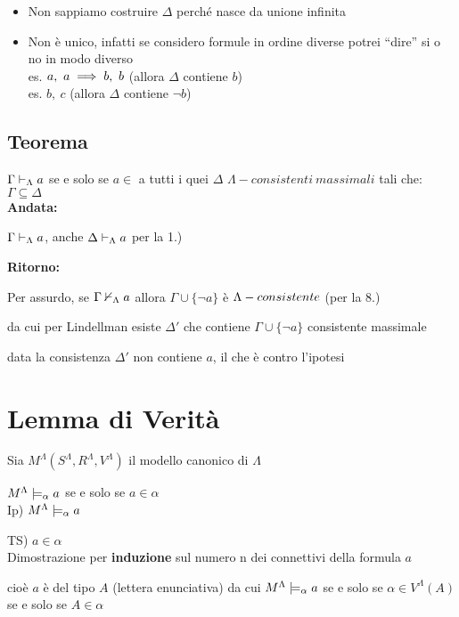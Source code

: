  
\begin{itemize}
\item Non sappiamo costruire $\Delta$ perché nasce da unione infinita 
\item Non è unico, infatti se considero formule in ordine diverse potrei
``dire'' si o no in modo diverso \\
 es. $a,\ a\implies b,\ b$ (allora $\Delta$ contiene $b$)\\
 es. $b,\ c$ (allora $\Delta$ contiene $\neg b$) 
\end{itemize}

\subsection{Teorema}

$\Gamma\vdash_{\Lambda}a$ se e solo se $a\in$ a tutti i quei $\Delta$ $\Lambda-consistenti\ massimali$
tali che: $\Gamma\subseteq\Delta$\\


\textbf{Andata:}

$\Gamma\vdash_{\Lambda}a$, anche $\Delta\vdash_{\Lambda}a$ per la 1.)

\textbf{Ritorno:}

Per assurdo, se $\Gamma\nvdash_{\Lambda}a$ allora $\Gamma\cup\{\neg a\}$
è $\mbox{\ensuremath{\Lambda}}-consistente$ (per la 8.)

da cui per Lindellman esiste $\Delta'$ che contiene $\Gamma\cup\{\neg a\}$
consistente massimale

data la consistenza $\Delta'$ non contiene $a$, il che è contro
l'ipotesi \lightning


\section{Lemma di Verità}

Sia $M^{\Lambda}(S^{\Lambda},R^{\Lambda},V^{\Lambda})$ il modello
canonico di $\Lambda$

$M^{\Lambda}\models_{\alpha}a$ se e solo se $a\in\alpha$\\


Ip) $M^{\Lambda}\models_{\alpha}a$

TS) $a\in\alpha$\\


Dimostrazione per \textbf{induzione} sul numero n dei connettivi della
formula $a$

 cioè $a$ è del tipo $A$ (lettera enunciativa) da
cui $M^{\Lambda}\models_{\alpha}a$ se e solo se $\alpha\in V^{\Lambda}(A)$
se e solo se $A\in\alpha$


